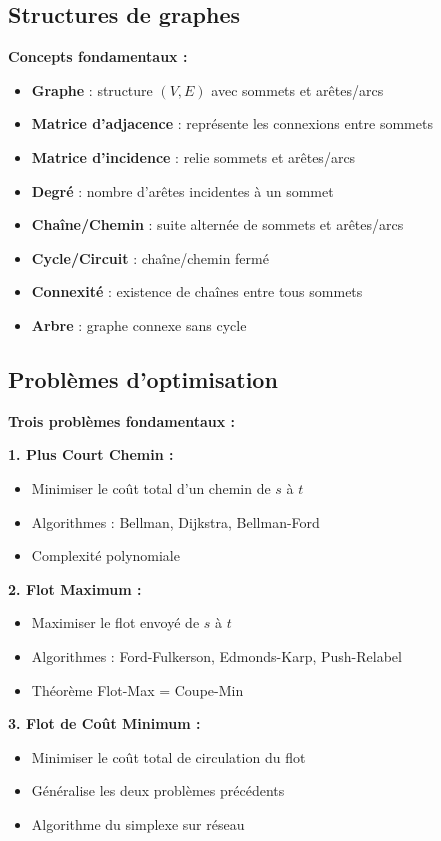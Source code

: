\documentclass[12pt,a4paper]{article}
\begin{document}
\subsection{Structures de graphes}

\begin{astuce}
\textbf{Concepts fondamentaux :}
\begin{itemize}
    \item \textcolor{titrebleu}{\textbf{Graphe}} : structure $(V, E)$ avec sommets et arêtes/arcs
    \item \textcolor{defvert}{\textbf{Matrice d'adjacence}} : représente les connexions entre sommets
    \item \textcolor{algoviolet}{\textbf{Matrice d'incidence}} : relie sommets et arêtes/arcs
    \item \textcolor{exempleorange}{\textbf{Degré}} : nombre d'arêtes incidentes à un sommet
    \item \textcolor{titrebleu}{\textbf{Chaîne/Chemin}} : suite alternée de sommets et arêtes/arcs
    \item \textcolor{defvert}{\textbf{Cycle/Circuit}} : chaîne/chemin fermé
    \item \textcolor{algoviolet}{\textbf{Connexité}} : existence de chaînes entre tous sommets
    \item \textcolor{exempleorange}{\textbf{Arbre}} : graphe connexe sans cycle
\end{itemize}
\end{astuce}

\subsection{Problèmes d'optimisation}

\begin{important}
\textbf{Trois problèmes fondamentaux :}

\textbf{1. Plus Court Chemin :}
\begin{itemize}
    \item Minimiser le coût total d'un chemin de $s$ à $t$
    \item Algorithmes : Bellman, Dijkstra, Bellman-Ford
    \item Complexité polynomiale
\end{itemize}

\textbf{2. Flot Maximum :}
\begin{itemize}
    \item Maximiser le flot envoyé de $s$ à $t$
    \item Algorithmes : Ford-Fulkerson, Edmonds-Karp, Push-Relabel
    \item Théorème Flot-Max = Coupe-Min
\end{itemize}

\textbf{3. Flot de Coût Minimum :}
\begin{itemize}
    \item Minimiser le coût total de circulation du flot
    \item Généralise les deux problèmes précédents
    \item Algorithme du simplexe sur réseau
\end{itemize}
\end{important}
\end{document}
